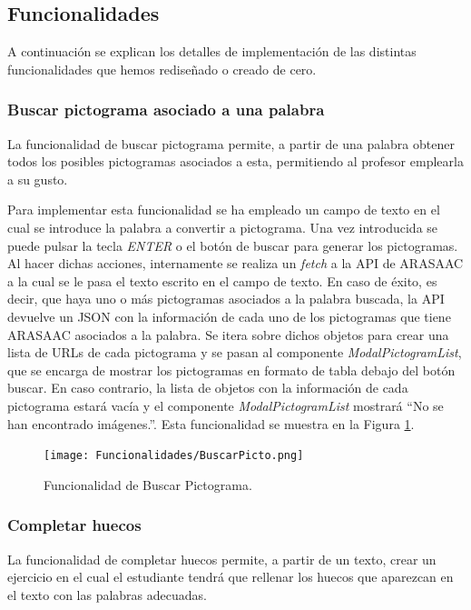 \subsection{Funcionalidades}
A continuación se explican los detalles de implementación de las distintas funcionalidades que hemos rediseñado o creado de cero.

\subsubsection{Buscar pictograma asociado a una palabra}
\label{sec:impbuscarpicto}
La funcionalidad de buscar pictograma permite, a partir de una palabra obtener todos los posibles pictogramas asociados a esta, permitiendo al profesor emplearla a su gusto.

Para implementar esta funcionalidad se ha empleado un campo de texto en el cual se introduce la palabra a convertir a pictograma. Una vez introducida se puede pulsar la tecla \textit{ENTER} o el botón de buscar para generar los pictogramas. Al hacer dichas acciones, internamente se realiza un \textit{fetch} a la API de ARASAAC a la cual se le pasa el texto escrito en el campo de texto. En caso de éxito, es decir, que haya uno o más pictogramas asociados a la palabra buscada, la API devuelve un JSON con la información de cada uno de los pictogramas que tiene ARASAAC asociados a la palabra. Se itera sobre dichos objetos para crear una lista de URLs de cada pictograma y se pasan al componente \textit{ModalPictogramList}, que se encarga de mostrar los pictogramas en formato de tabla debajo del botón buscar. En caso contrario, la lista de objetos con la información de cada pictograma estará vacía y el componente \textit{ModalPictogramList} mostrará ``No se han encontrado imágenes.''. Esta funcionalidad se muestra en la Figura \ref{fig:buscarPictograma}.

\begin{figure}[ht!]
  \centering
  \texttt{[image: Funcionalidades/BuscarPicto.png]}
  \caption{Funcionalidad de Buscar Pictograma.}
  \label{fig:buscarPictograma}
\end{figure}

\subsubsection{Completar huecos}
\label{sec:impcompletarhuecos}
La funcionalidad de completar huecos permite, a partir de un texto, crear un ejercicio en el cual el estudiante tendrá que rellenar los huecos que aparezcan en el texto con las palabras adecuadas.

